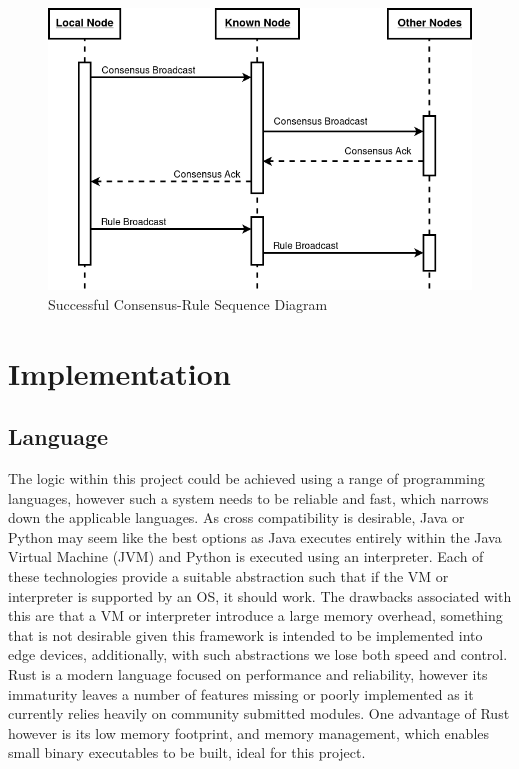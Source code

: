\documentclass[a4paper, 11pt]{report}
\begin{document}
\begin{figure}[H]
\centering
\includegraphics[width=\textwidth,keepaspectratio]{consensus_rule_seq}
\caption{Successful Consensus-Rule Sequence Diagram} 
\label{fig:consruleseq}
\end{figure}

\chapter{Implementation}

\section{Language}
The logic within this project could be achieved using a range of programming languages, however such a system needs to be reliable and fast, which narrows down the applicable languages. As cross compatibility is desirable, Java\cite{java} or Python\cite{python} may seem like the best options as Java executes entirely within the Java Virtual Machine (JVM)\cite{jvm} and Python is executed using an interpreter. Each of these technologies provide a suitable abstraction such that if the \acrshort{VM} or interpreter is supported by an \acrshort{OS}, it should work. The drawbacks associated with this are that a \acrshort{VM} or interpreter introduce a large memory overhead, something that is not desirable given this framework is intended to be implemented into edge devices, additionally, with such abstractions we lose both speed and control. Rust\cite{rust} is a modern language focused on performance and reliability, however its immaturity leaves a number of features missing or poorly implemented as it currently relies heavily on community submitted modules. One advantage of Rust however is its low memory footprint, and memory management, which enables small binary executables to be built, ideal for this project. 
\end{document}
